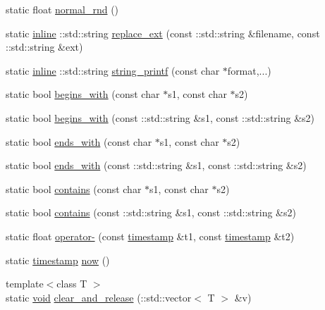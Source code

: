 \begin{DoxyCompactItemize}
\item 
static float \hyperlink{namespacetrimesh_a8365b585f63a97afe9c9ec4167170f73}{normal\+\_\+rnd} ()
\item 
static \hyperlink{XForm_8h_a00d24c7231be28dbaf71f5408f30e44c}{inline} \+::std\+::string \hyperlink{namespacetrimesh_a19623fde9977f1ed5597291d8661621f}{replace\+\_\+ext} (const \+::std\+::string \&filename, const \+::std\+::string \&ext)
\item 
static \hyperlink{XForm_8h_a00d24c7231be28dbaf71f5408f30e44c}{inline} \+::std\+::string \hyperlink{namespacetrimesh_a3c56ee7219dbd7fd846eac4add4e9aa6}{string\+\_\+printf} (const char $\ast$format,...)
\item 
static bool \hyperlink{namespacetrimesh_a422b589a796509785836b3f3f6f62035}{begins\+\_\+with} (const char $\ast$s1, const char $\ast$s2)
\item 
static bool \hyperlink{namespacetrimesh_a34d80be5fbd2f6df95fb17d680510222}{begins\+\_\+with} (const \+::std\+::string \&s1, const \+::std\+::string \&s2)
\item 
static bool \hyperlink{namespacetrimesh_a926d2d6035db34c335f52af68daa3238}{ends\+\_\+with} (const char $\ast$s1, const char $\ast$s2)
\item 
static bool \hyperlink{namespacetrimesh_a83cec2fde835ac957834a5bebd7ed71e}{ends\+\_\+with} (const \+::std\+::string \&s1, const \+::std\+::string \&s2)
\item 
static bool \hyperlink{namespacetrimesh_a03a8fbb8c2653c41949c89365b11b720}{contains} (const char $\ast$s1, const char $\ast$s2)
\item 
static bool \hyperlink{namespacetrimesh_a3ebcac5989433e31b67168091cc66062}{contains} (const \+::std\+::string \&s1, const \+::std\+::string \&s2)
\item 
static float \hyperlink{namespacetrimesh_ae09626ee94207fe21f07ab66c96bd437}{operator-\/} (const \hyperlink{namespacetrimesh_afc360812cb91ca27ac234664b59fe356}{timestamp} \&t1, const \hyperlink{namespacetrimesh_afc360812cb91ca27ac234664b59fe356}{timestamp} \&t2)
\item 
static \hyperlink{namespacetrimesh_afc360812cb91ca27ac234664b59fe356}{timestamp} \hyperlink{namespacetrimesh_a2bac0c9856bf384a1722af520298f84e}{now} ()
\item 
{\footnotesize template$<$class T $>$ }\\static \hyperlink{namespacetrimesh_a784ddfd979e1c579bda795a8edfc3f43}{void} \hyperlink{namespacetrimesh_a795d71444546c11c5cf031befe1c5b5f}{clear\+\_\+and\+\_\+release} (\+::std\+::vector$<$ T $>$ \&v)

\end{DoxyCompactItemize}
